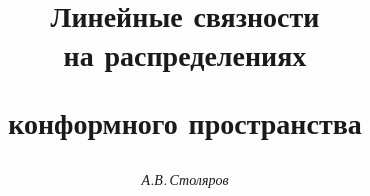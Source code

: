 

 


% 


\newcommand{\M}[1]{\mathrm{#1}}


\newcommand{\up}[2]{\overset{#1}{#2}{}} 


\newcommand{\eqdef}{\overset{\mathrm{def}}{=}\,} 


\newcommand{\Mod}{\operatorname{mod}} 


\newcommand{\tts}[1]{} 


 




\setcounter{page}{60} 












 


\author{\it А.В.\,Столяров} 




\title{Линейные связности\\ на распределениях  


конформного пространства} 


 


\date{} 




\pagestyle{plain} %


 




\maketitle 



